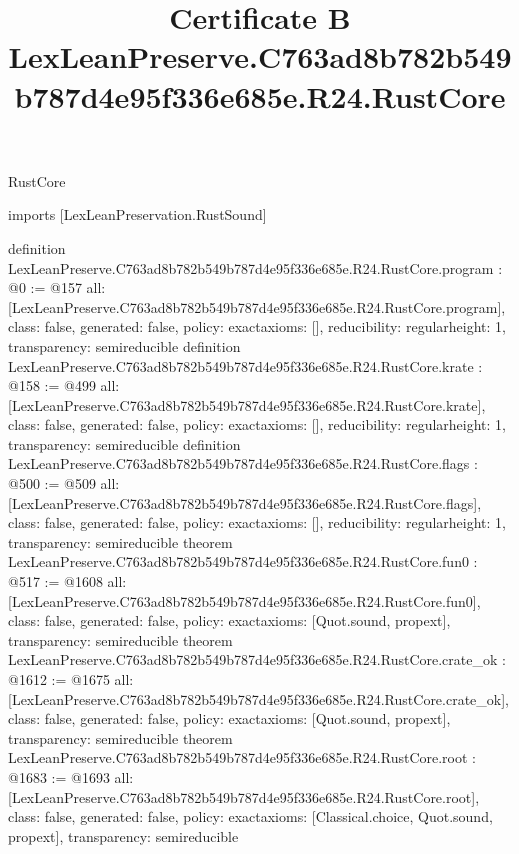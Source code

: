 \begin{lexlean}{RustCore}
\title{Certificate B LexLeanPreserve.C763ad8b782b549b787d4e95f336e685e.R24.RustCore}
\begin{coremodule}
imports [LexLeanPreservation.RustSound]

definition LexLeanPreserve.C763ad8b782b549b787d4e95f336e685e.R24.RustCore.program : @0 := @157 {
  all: [LexLeanPreserve.C763ad8b782b549b787d4e95f336e685e.R24.RustCore.program],
  class: false,
  generated: false,
  policy: exact{axioms: []},
  reducibility: regular{height: 1},
  transparency: semireducible
}
definition LexLeanPreserve.C763ad8b782b549b787d4e95f336e685e.R24.RustCore.krate : @158 := @499 {
  all: [LexLeanPreserve.C763ad8b782b549b787d4e95f336e685e.R24.RustCore.krate],
  class: false,
  generated: false,
  policy: exact{axioms: []},
  reducibility: regular{height: 1},
  transparency: semireducible
}
definition LexLeanPreserve.C763ad8b782b549b787d4e95f336e685e.R24.RustCore.flags : @500 := @509 {
  all: [LexLeanPreserve.C763ad8b782b549b787d4e95f336e685e.R24.RustCore.flags],
  class: false,
  generated: false,
  policy: exact{axioms: []},
  reducibility: regular{height: 1},
  transparency: semireducible
}
theorem LexLeanPreserve.C763ad8b782b549b787d4e95f336e685e.R24.RustCore.fun0 : @517 := @1608 {
  all: [LexLeanPreserve.C763ad8b782b549b787d4e95f336e685e.R24.RustCore.fun0],
  class: false,
  generated: false,
  policy: exact{axioms: [Quot.sound, propext]},
  transparency: semireducible
}
theorem LexLeanPreserve.C763ad8b782b549b787d4e95f336e685e.R24.RustCore.crate_ok : @1612 := @1675 {
  all: [LexLeanPreserve.C763ad8b782b549b787d4e95f336e685e.R24.RustCore.crate_ok],
  class: false,
  generated: false,
  policy: exact{axioms: [Quot.sound, propext]},
  transparency: semireducible
}
theorem LexLeanPreserve.C763ad8b782b549b787d4e95f336e685e.R24.RustCore.root : @1683 := @1693 {
  all: [LexLeanPreserve.C763ad8b782b549b787d4e95f336e685e.R24.RustCore.root],
  class: false,
  generated: false,
  policy: exact{axioms: [Classical.choice, Quot.sound, propext]},
  transparency: semireducible
}


\end{coremodule}
\end{lexlean}
